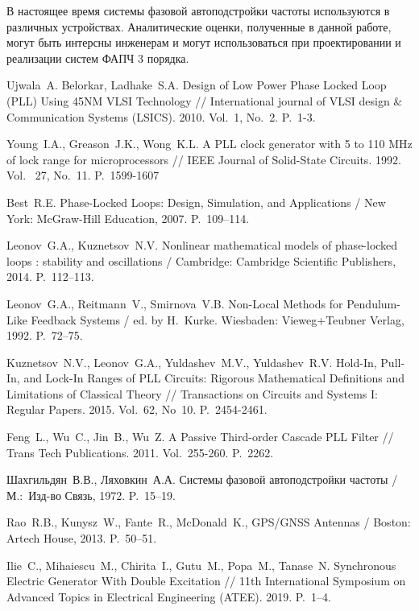 \documentclass[a4paper,14pt]{article} %
\theoremstyle{cited}
\begin{document}
 В настоящее время системы фазовой автоподстройки частоты используются в различных устройствах. Аналитические оценки, полученные в данной работе, могут быть интерсны инженерам и могут использоваться при проектировании и реализации систем ФАПЧ 3 порядка.
 
\pagebreak
\begin{thebibliography}{20}
Ujwala~A. Belorkar, Ladhake~S.\:A. Design of Low Power Phase Locked Loop (PLL) Using 45NM VLSI Technology // International journal of VLSI design \& Communication Systems  (LSICS). 2010. Vol.~1, No.~2. P.~1-3.

Young~I.\:A., Greason~J.\:K., Wong~K.\:L. A PLL clock generator with 5 to 110 MHz of lock range for microprocessors //  IEEE Journal of Solid-State Circuits. 1992. Vol.~ 27, No.~11. P.~1599-1607
 
  Best~R.\:E. Phase-Locked Loops: Design, Simulation, and Applications / New York: McGraw-Hill Education, 2007. P.~109--114.
 
  Leonov~G.\:A., Kuznetsov~N.\:V. Nonlinear mathematical models of phase-locked loops : stability and oscillations / Cambridge: Cambridge Scientific Publishers, 2014. P.~112--113.

  Leonov~G.\:A., Reitmann~V., Smirnova~V.\:B. Non-Local Methods for Pendulum-Like Feedback Systems / ed. by H.~Kurke. Wiesbaden: Vieweg+Teubner Verlag, 1992. P.~72--75.

 Kuznetsov~N.\:V., Leonov~G.\:A., Yuldashev~M.\:V., Yuldashev~R.\:V. Hold-In, Pull-In, and Lock-In Ranges of PLL Circuits: Rigorous Mathematical Definitions and Limitations of Classical Theory // Transactions on Circuits and Systems I: Regular Papers. 2015. Vol.~62, No~10. P.~2454-2461.

 Feng~L., Wu~C., Jin~B., Wu~Z. A Passive Third-order Cascade PLL Filter // Trans Tech Publications. 2011. Vol.~255-260. P.~2262.

  Шахгильдян~В.\:В., Ляховкин~А.\:А. Системы фазовой автоподстройки частоты / М.:~Изд-во Связь, 1972. P.~15--19.

  Rao~R.\:B., Kunysz~W., Fante~R., McDonald~K., GPS/GNSS Antennas / Boston: Artech House, 2013. P.~50--51.

 Ilie~C., Mihaiescu~M., Chirita~I., Gutu~M., Popa~M., Tanase~N. Synchronous Electric Generator With Double Excitation // 11th International Symposium on Advanced Topics in Electrical Engineering (ATEE). 2019. P.~1--4.


\end{thebibliography}
\end{document}
